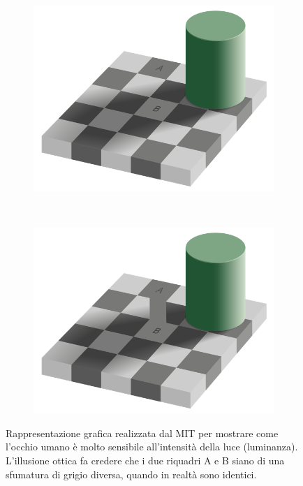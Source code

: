 
\begin{figure}[htbp]
	\centering
	
	\begin{subfigure}[t]{0.45\textwidth}
		\centering
		\includegraphics[width=\textwidth]{res/mit1.png}
	\end{subfigure}%
	~ 
	\begin{subfigure}[t]{0.45\textwidth}
		\centering
		\includegraphics[width=\textwidth]{res/mit2.png}
	\end{subfigure}
	
	\caption{Rappresentazione grafica realizzata dal MIT\protect\footnotemark{} per mostrare come l'occhio umano è molto sensibile all'intensità della luce (luminanza). L'illusione ottica fa credere che i due riquadri A e B siano di una sfumatura di grigio diversa, quando in realtà sono identici.}
	\label{fig:diff_mit}
\end{figure}

